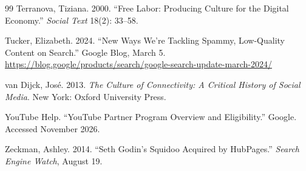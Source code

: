 \documentclass[11pt]{article}
\theoremstyle{remark}
\begin{document}
\begin{thebibliography}{99}
Terranova, Tiziana. 2000. ``Free Labor: Producing Culture for the Digital Economy.'' \emph{Social Text} 18(2): 33--58.

Tucker, Elizabeth. 2024. ``New Ways We're Tackling Spammy, Low-Quality Content on Search.'' Google Blog, March 5. \url{https://blog.google/products/search/google-search-update-march-2024/}

van Dijck, Jos\'e. 2013. \emph{The Culture of Connectivity: A Critical History of Social Media}. New York: Oxford University Press.

YouTube Help. ``YouTube Partner Program Overview and Eligibility.'' Google. Accessed November 2026.

Zeckman, Ashley. 2014. ``Seth Godin's Squidoo Acquired by HubPages.'' \emph{Search Engine Watch}, August 19.

\end{thebibliography}
\end{document}

